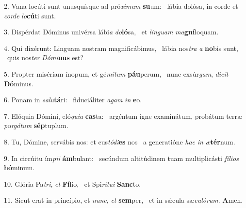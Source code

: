 2. Vana locúti sunt unusquísque ad pró\textit{xi}\textit{mum} \textbf{su}um: \ast\  lábia dolósa, in corde et \textit{cor}\textit{de} \textit{lo}\textbf{cú}ti sunt.\

3. Dispérdat Dóminus univérsa lábi\textit{a} \textit{do}\textbf{ló}sa, \ast\  et \textit{lin}\textit{guam} \textit{ma}\textbf{gní}loquam.\

4. Qui dixérunt: Linguam nostram magnificábimus, \dag\  lábia nos\textit{tra} \textit{a} \textbf{no}bis sunt, \ast\  quis nos\textit{ter} \textit{Dó}\textit{mi}\textbf{nus} est?\

5. Propter misériam ínopum, et gé\textit{mi}\textit{tum} \textbf{páu}perum, \ast\  nunc exsúr\textit{gam}, \textit{di}\textit{cit} \textbf{Dó}minus.\

6. Ponam in \textit{sa}\textit{lu}\textbf{tá}ri: \ast\  fiduciáliter \textit{a}\textit{gam} \textit{in} \textbf{e}o.\

7. Elóquia Dómini, eló\textit{qui}\textit{a} \textbf{cas}ta: \ast\  argéntum igne examinátum, probátum terræ \textit{pur}\textit{gá}\textit{tum} \textbf{sép}tuplum.\

8. Tu, Dómine, servábis nos: et cus\textit{tó}\textit{di}\textbf{es} nos \ast\  a generatióne \textit{hac} \textit{in} \textit{æ}\textbf{tér}num.\

9. In circúitu ím\textit{pi}\textit{i} \textbf{ám}bulant: \ast\  secúndum altitúdinem tuam multiplicásti \textit{fí}\textit{li}\textit{os} \textbf{hó}minum.\

10. Glória Pa\textit{tri}, \textit{et} \textbf{Fí}lio, \ast\  et Spi\textit{rí}\textit{tu}\textit{i} \textbf{Sanc}to.\

11. Sicut erat in princípio, et \textit{nunc}, \textit{et} \textbf{sem}per, \ast\  et in sǽcula sæ\textit{cu}\textit{ló}\textit{rum}. \textbf{A}men.\

